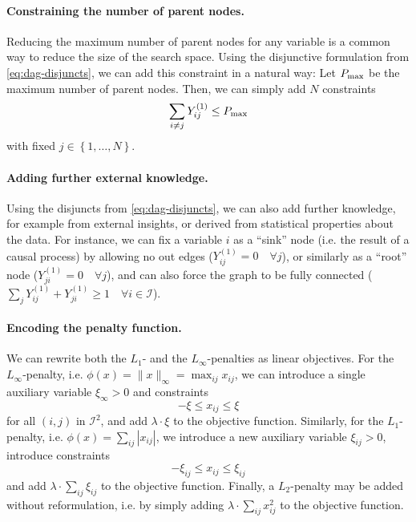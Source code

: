 \documentclass[11pt]{article}
\begin{document}
\paragraph{Constraining the number of parent nodes.}
\label{sec:org46012f7}
Reducing the maximum number of parent nodes for any variable is a common way to reduce the size of the search space.
Using the disjunctive formulation from \cref{eq:dag-disjuncts}, we can add this constraint in a natural way:
Let \(P_{\rm max}\) be the maximum number of parent nodes.
Then, we can simply add \(N\) constraints
\begin{equation}
\label{eq:max-parents}
\sum_{i \neq j} Y^{(1)}_{ij} \leq P_{\rm max}
\end{equation}
with fixed \(j \in \left\{ 1, \dots, N \right\}\).

\paragraph{Adding further external knowledge.}
\label{sec:org2db7622}
Using the disjuncts from \cref{eq:dag-disjuncts}, we can also add further knowledge, for example from external insights, or derived from statistical properties about the data.
For instance, we can fix a variable \(i\) as a ``sink'' node (i.e. the result of a causal process) by allowing no out edges (\(Y_{ij}^{(1)} = 0 \quad \forall j\)), or similarly as a ``root'' node (\(Y_{ji}^{(1)} = 0 \quad \forall j\)), and can also force the graph to be fully connected (\(\sum_j Y^{(1)}_{ij} + Y^{(1)}_{ji} \geq 1 \quad \forall i \in \mathcal{I}\)).

\paragraph{Encoding the penalty function.}
\label{sec:org020c63e}
We can rewrite both the \(L_1\)- and the \(L_\infty\)-penalties as linear objectives.
For the \(L_\infty\)-penalty, i.e. \(\phi(x) = \|x\|_\infty = \max_{ij} x_{ij}\),
we can introduce a single auxiliary variable \(\xi_\infty > 0\) and constraints
\begin{equation}
-\xi \leq x_{ij} \leq \xi
\end{equation}
for all \((i, j)\) in \(\mathcal{I}^2\), and add \(\lambda \cdot \xi\) to the objective function.
Similarly, for the \(L_1\)-penalty, i.e. \(\phi(x) = \sum_{ij} |x_{ij}|\), we introduce a new auxiliary variable \(\xi_{ij} > 0\), introduce constraints
\begin{equation}
-\xi_{ij} \leq x_{ij} \leq \xi_{ij}
\end{equation}
and add \(\lambda \cdot \sum_{ij}\xi_{ij}\) to the objective function.
Finally, a \(L_2\)-penalty may be added without reformulation, i.e. by simply adding \(\lambda \cdot \sum_{ij} x_{ij}^2\) to the objective function.
\end{document}
